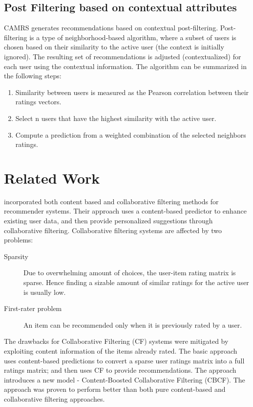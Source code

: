 \documentclass{article}
\begin{document}

\subsection{Post Filtering based on contextual attributes}
CAMRS generates recommendations based on contextual post-filtering. Post-filtering is a type of neighborhood-based algorithm, where a subset of users is chosen based on their similarity to the active user (the context is initially ignored). The resulting set of recommendations is adjusted (contextualized) for each user using the contextual information. The algorithm can be summarized in the following steps:
\begin{enumerate}
 \item Similarity between users is measured as the Pearson correlation between their ratings vectors.
 \item Select n users that have the highest similarity with the active user.
 \item Compute a prediction from a weighted combination of the selected neighbors ratings.
\end{enumerate}

\section{Related Work}
\cite{melville2002content} incorporated both content based and collaborative filtering methods for recommender systems. Their approach uses a content-based predictor to enhance existing user data, and then provide personalized suggestions through collaborative filtering. Collaborative filtering systems are affected by two problems:
\begin{description}
\item[Sparsity] Due to overwhelming amount of choices, the user-item rating matrix is sparse. Hence finding a sizable amount of similar ratings for the active user is usually low.\item[First-rater problem] An item can be recommended only when it is previously rated by a user.
\end{description}
The drawbacks for Collaborative Filtering (CF) systems were mitigated by exploiting content information of the items already rated. The basic approach uses content-based predictions to convert a sparse user ratings matrix into a full ratings matrix; and then uses CF to provide recommendations. The approach introduces a new model - Content-Boosted Collaborative Filtering (CBCF). The approach was proven to perform better than both pure content-based and collaborative filtering approaches.
\end{document}
